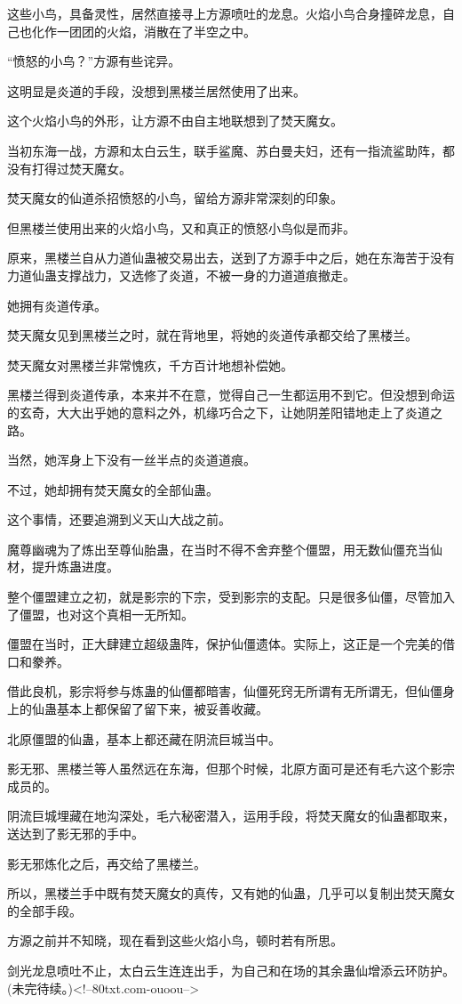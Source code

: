 \begin{this_body}
这些小鸟，具备灵性，居然直接寻上方源喷吐的龙息。火焰小鸟合身撞碎龙息，自己也化作一团团的火焰，消散在了半空之中。

“愤怒的小鸟？”方源有些诧异。

这明显是炎道的手段，没想到黑楼兰居然使用了出来。

这个火焰小鸟的外形，让方源不由自主地联想到了焚天魔女。

当初东海一战，方源和太白云生，联手鲨魔、苏白曼夫妇，还有一指流鲨助阵，都没有打得过焚天魔女。

焚天魔女的仙道杀招愤怒的小鸟，留给方源非常深刻的印象。

但黑楼兰使用出来的火焰小鸟，又和真正的愤怒小鸟似是而非。

原来，黑楼兰自从力道仙蛊被交易出去，送到了方源手中之后，她在东海苦于没有力道仙蛊支撑战力，又选修了炎道，不被一身的力道道痕撤走。

她拥有炎道传承。

焚天魔女见到黑楼兰之时，就在背地里，将她的炎道传承都交给了黑楼兰。

焚天魔女对黑楼兰非常愧疚，千方百计地想补偿她。

黑楼兰得到炎道传承，本来并不在意，觉得自己一生都运用不到它。但没想到命运的玄奇，大大出乎她的意料之外，机缘巧合之下，让她阴差阳错地走上了炎道之路。

当然，她浑身上下没有一丝半点的炎道道痕。

不过，她却拥有焚天魔女的全部仙蛊。

这个事情，还要追溯到义天山大战之前。

魔尊幽魂为了炼出至尊仙胎蛊，在当时不得不舍弃整个僵盟，用无数仙僵充当仙材，提升炼蛊进度。

整个僵盟建立之初，就是影宗的下宗，受到影宗的支配。只是很多仙僵，尽管加入了僵盟，也对这个真相一无所知。

僵盟在当时，正大肆建立超级蛊阵，保护仙僵遗体。实际上，这正是一个完美的借口和豢养。

借此良机，影宗将参与炼蛊的仙僵都暗害，仙僵死窍无所谓有无所谓无，但仙僵身上的仙蛊基本上都保留了留下来，被妥善收藏。

北原僵盟的仙蛊，基本上都还藏在阴流巨城当中。

影无邪、黑楼兰等人虽然远在东海，但那个时候，北原方面可是还有毛六这个影宗成员的。

阴流巨城埋藏在地沟深处，毛六秘密潜入，运用手段，将焚天魔女的仙蛊都取来，送达到了影无邪的手中。

影无邪炼化之后，再交给了黑楼兰。

所以，黑楼兰手中既有焚天魔女的真传，又有她的仙蛊，几乎可以复制出焚天魔女的全部手段。

方源之前并不知晓，现在看到这些火焰小鸟，顿时若有所思。

剑光龙息喷吐不止，太白云生连连出手，为自己和在场的其余蛊仙增添云环防护。(未完待续。)<!--80txt.com-ouoou-->

\end{this_body}

